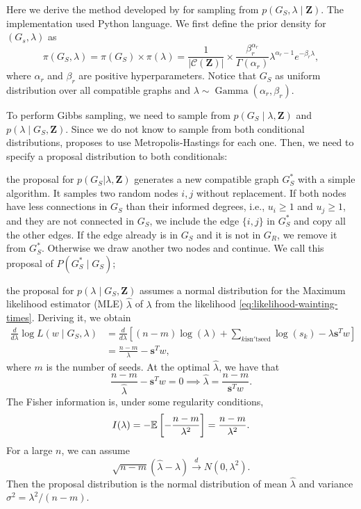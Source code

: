 Here we derive the method developed by \textcite{crawford2016} for sampling
from $p(G_S, \lambda \mid \boldsymbol{Z})$. The
implementation used Python language. We first define
the prior density for $(G_s, \lambda)$ as 
$$
\pi(G_S, \lambda) = \pi(G_S) \times \pi(\lambda) = \frac{1}{|\mathcal{C}(\boldsymbol{Z})|} \times \frac{\beta_{r}^{\alpha_{r}}}{\Gamma(\alpha_{r})}\lambda^{\alpha_r - 1}e^{-\beta_r \lambda}, 
$$
where $\alpha_r$ and $\beta_r$ are positive hyperparameters. Notice that $G_S$
as uniform distribution over all compatible graphs and $\lambda \sim
\operatorname{Gamma}(\alpha_r, \beta_r)$.

To perform Gibbs sampling, we need to sample from $p(G_S \mid \lambda,
\boldsymbol{Z})$ and $p(\lambda \mid G_S , \boldsymbol{Z})$. Since we do not
know to sample from both conditional distributions, \textcite{crawford2016}
proposes to use Metropolis-Hastings for each one. Then, we need to specify a
proposal distribution to both conditionals:
\begin{alineas}
  \item the proposal for $p (G_S | \lambda, \boldsymbol{Z})$ generates a new compatible graph
   $G_S^*$ with a simple algorithm. It samples two random nodes $i,j$
   without replacement. If both nodes have less connections in $G_S$ than
   their informed degrees, i.e., $u_i \ge 1$ and
   $u_j \ge 1$, and they are not connected in $G_S$, we include the edge
   $\{i,j\}$ in $G_S^*$ and copy all the other edges. If the edge already is
   in $G_S$ and it is not in $G_R$, we remove it from $G_S^*$. Otherwise we
   draw another two nodes and continue. We call this proposal of $P(G_S^* \mid
   G_S)$; 
   \item the proposal for $p(\lambda \mid G_S, \boldsymbol{Z})$ assumes a
   normal distribution for the Maximum likelihood estimator (MLE)
   $\hat{\lambda}$ of $\lambda$ from the likelihood
   \eqref{eq:likelihood-wainting-times}. Deriving it, we obtain 
   \begin{equation*}
     \begin{split}
      \frac{d}{d \lambda} \log L(w \mid G_S, \lambda) &= \frac{d}{d \lambda}\left[ (n - m)\log(\lambda) + \sum_{k \mathrm{isn't seed}} \log(s_k) - \lambda \boldsymbol{s}^Tw\right] \\
      &= \frac{n-m}{\lambda} - \boldsymbol{s}^Tw,
     \end{split}
   \end{equation*}
   where $m$ is the number of seeds. At the optimal $\hat{\lambda}$, we have
   that 
   $$
   \frac{n-m}{\hat{\lambda}} - \boldsymbol{s}^Tw = 0 \implies \hat{\lambda} = \frac{n-m}{\boldsymbol{s}^Tw}.
   $$
   The Fisher information is, under some regularity conditions,
   $$
   I(\lambda) = -\mathbb{E}\left[-\frac{n-m}{\lambda^2}\right] = \frac{n-m}{\lambda^2}.
   $$
   For a large $n$, we can assume
   $$\sqrt{n-m}(\hat{\lambda} - \lambda) \overset{d}{\to} N(0, \lambda^2).$$ 
   Then the proposal distribution is the normal distribution of mean
   $\hat{\lambda}$ and variance $\sigma^2 = \lambda^2/(n - m)$.
\end{alineas} 

